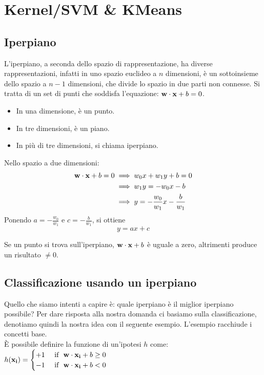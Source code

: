\section{Kernel/SVM \& KMeans}
\subsection{Iperpiano}
L'iperpiano, a seconda dello spazio di rappresentazione, ha diverse rappresentazioni, infatti in uno spazio euclideo a $n$ dimensioni, è un sottoinsieme dello spazio a $n-1$ dimensioni, che divide lo spazio in due parti non connesse. Si tratta di un set di punti che soddisfa l’equazione: $\bold{w} \cdot \bold{x} + b = 0$.
\begin{itemize}
    \item In una dimensione, è un punto.
    \item In tre dimensioni, è un piano.
    \item 
In più di tre dimensioni, si chiama iperpiano.
\end{itemize}

Nello spazio a due dimensioni:
\begin{equation*}
    \begin{split}
        \bold{w} \cdot \bold{x} + b = 0 & \implies w_0 x + w_1 y + b = 0\\
        & \implies w_1 y = -w_0 x - b\\
        & \implies y = \displaystyle -\frac{w_0}{w_1}x - \frac{b}{w_1}
    \end{split}
\end{equation*}
Ponendo $a = \displaystyle -\frac{w_0}{w_1}$ e $c = \displaystyle - \frac{b}{w_1}$, si ottiene \[y = ax + c\]

Se un punto si trova sull’iperpiano, $\bold{w} \cdot \bold{x} + b$ è uguale a zero, altrimenti produce un risultato $\neq 0$. 
\subsection{Classificazione usando un iperpiano}
Quello che siamo intenti a capire è: quale iperpiano è il miglior iperpiano possibile? Per dare risposta alla nostra domanda ci basiamo sulla classificazione, denotiamo quindi la nostra idea con il seguente esempio. L'esempio racchiude i concetti base.\\

È possibile definire la funzione di un’ipotesi $h$ come: 
$h(\bold{x_i}) = 
    \begin{cases} 
        + 1 & \text{ if }\ \bold{w} \cdot \bold{x_i} + b \geq 0 \\ 
        - 1 & \text{ if }\ \bold{w} \cdot \bold{x_i} + b < 0
    \end{cases}
$\\

